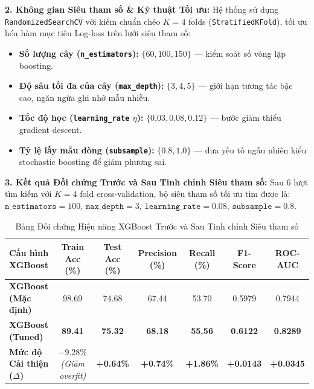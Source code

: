 \documentclass[12pt,a4paper]{report}
\begin{document}
\textbf{2. Không gian Siêu tham số \& Kỹ thuật Tối ưu:}
Hệ thống sử dụng \texttt{RandomizedSearchCV} với kiểm chuẩn chéo $K=4$ folds (\texttt{StratifiedKFold}), tối ưu hóa hàm mục tiêu Log-loss trên lưới siêu tham số:
\begin{itemize}[leftmargin=1.5em]
    \item \textbf{Số lượng cây (\texttt{n\_estimators}):} $\{60, 100, 150\}$ — kiểm soát số vòng lặp boosting.
    \item \textbf{Độ sâu tối đa của cây (\texttt{max\_depth}):} $\{3, 4, 5\}$ — giới hạn tương tác bậc cao, ngăn ngừa ghi nhớ mẫu nhiễu.
    \item \textbf{Tốc độ học (\texttt{learning\_rate} $\eta$):} $\{0.03, 0.08, 0.12\}$ — bước giảm thiểu gradient descent.
    \item \textbf{Tỷ lệ lấy mẫu dòng (\texttt{subsample}):} $\{0.8, 1.0\}$ — đưa yếu tố ngẫu nhiên kiểu stochastic boosting để giảm phương sai.
\end{itemize}

\textbf{3. Kết quả Đối chứng Trước và Sau Tinh chỉnh Siêu tham số:}
Sau $6$ lượt tìm kiếm với $K=4$ fold cross-validation, bộ siêu tham số tối ưu tìm được là: $\texttt{n\_estimators} = 100$, $\texttt{max\_depth} = 3$, $\texttt{learning\_rate} = 0.08$, $\texttt{subsample} = 0.8$.

\begin{table}[H]
\centering
\small
\setlength{\tabcolsep}{4pt}
\begin{tabular}{lcccccc}
\toprule
\textbf{Cấu hình XGBoost} & \textbf{Train Acc (\%)} & \textbf{Test Acc (\%)} & \textbf{Precision (\%)} & \textbf{Recall (\%)} & \textbf{F1-Score} & \textbf{ROC-AUC} \\
\midrule
\textbf{XGBoost (Mặc định)} & 98.69 & 74.68 & 67.44 & 53.70 & 0.5979 & 0.7944 \\
\textbf{XGBoost (Tuned)} & \textbf{89.41} & \textbf{75.32} & \textbf{68.18} & \textbf{55.56} & \textbf{0.6122} & \textbf{0.8289} \\
\midrule
\textbf{Mức độ Cải thiện ($\Delta$)} & $-9.28\%$ \textit{(Giảm overfit)} & \textbf{+0.64\%} & \textbf{+0.74\%} & \textbf{+1.86\%} & \textbf{+0.0143} & \textbf{+0.0345} \\
\bottomrule
\end{tabular}
\caption{Bảng Đối chứng Hiệu năng XGBoost Trước và Sau Tinh chỉnh Siêu tham số}
\label{tab:week1_exp2}
\end{table}
\end{document}
